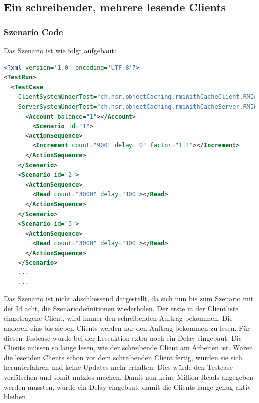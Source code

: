 \subsection{Ein schreibender, mehrere lesende Clients}
\subsubsection{Szenario Code}
Das Szenario ist wie folgt aufgebaut:
\begin{lstlisting}[language=XML, breaklines=true]
<?xml version='1.0' encoding='UTF-8'?>
<TestRun>
  <TestCase
    ClientSystemUnderTest="ch.hsr.objectCaching.rmiWithCacheClient.RMIwithCacheClientSystem"
    ServerSystemUnderTest="ch.hsr.objectCaching.rmiWithCacheServer.RMIWithCacheServerSystem">
      <Account balance="1"></Account>
        <Scenario id="1">
	  <ActionSequence>
	    <Increment count="900" delay="0" factor="1.1"></Increment>
	  </ActionSequence>
	</Scenario>
	<Scenario id="2">
	  <ActionSequence>
	    <Read count="3000" delay="100"></Read>
	  </ActionSequence>
	</Scenario>
	<Scenario id="3">
	  <ActionSequence>
	    <Read count="3000" delay="100"></Read>
	  </ActionSequence>
	</Scenario>
	...
	...
\end{lstlisting}

Das Szenario ist nicht abschliessend dargestellt, da sich nun bis zum Szenario mit der Id acht, die Szenariodefinitionen wiederholen. Der erste in der Clientliste eingetragene Client, wird immer den schreibenden Auftrag bekommen. Die anderen eins bis sieben Clients werden nur den Auftrag bekommen zu lesen. \newline
Für diesen Testcase wurde bei der Leseaktion extra noch ein Delay eingebaut. Die Clients müssen so lange lesen, wie der schreibende Client am Arbeiten ist. Wären die lesenden Clients schon vor dem schreibenden Client fertig, würden sie sich herunterfahren und keine Updates mehr erhalten. Dies würde den Testcase verfälschen und somit nutzlos machen. Damit nun keine Million Reads angegeben werden mussten, wurde ein Delay eingebaut, damit die Clients lange genug aktiv bleiben. 
